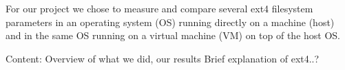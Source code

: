 For our project we chose to measure and compare several ext4 filesystem parameters
in an operating system (OS) running directly on a machine (host) and in the same 
OS running on a virtual machine (VM) on top of the host OS. 

Content:
Overview of what we did, our results
Brief explanation of ext4..?

